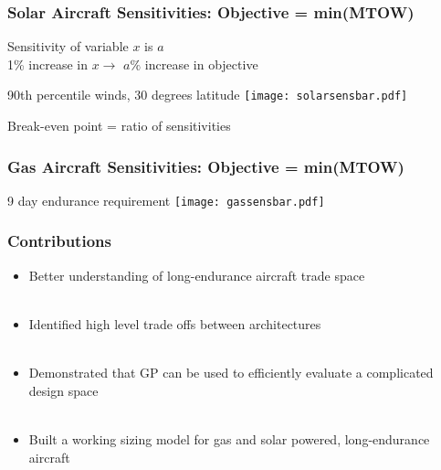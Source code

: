 \documentclass{beamer}
\begin{document}
\begin{frame}
    \frametitle{Solar Aircraft Sensitivities: Objective = min(MTOW)}

    \pause
    Sensitivity of variable $x$ is $a$ \\
    1\% increase in $x \rightarrow$ $a\%$ increase in objective 
    \pause
    \begin{center}
        \scriptsize
        90th percentile winds, 30 degrees latitude
    \texttt{[image: solarsensbar.pdf]} 
    \end{center}

    \pause
    Break-even point = ratio of sensitivities

\end{frame}

\begin{frame}
    \frametitle{Gas Aircraft Sensitivities: Objective = min(MTOW)}
    
    \pause
    
    \begin{center}
        \scriptsize
        9 day endurance requirement
    \texttt{[image: gassensbar.pdf]} 
    \end{center}

\end{frame}

\begin{frame}
    \frametitle{Contributions}

    \begin{itemize}
        \pause
        \item Better understanding of long-endurance aircraft trade space \\~\\
        \pause
        \item Identified high level trade offs between architectures \\~\\
        \pause
        \item Demonstrated that GP can be used to efficiently evaluate a complicated design space \\~\\
            \pause
        \item Built a working sizing model for gas and solar powered, long-endurance aircraft
        \end{itemize}

\end{frame}
\end{document}
